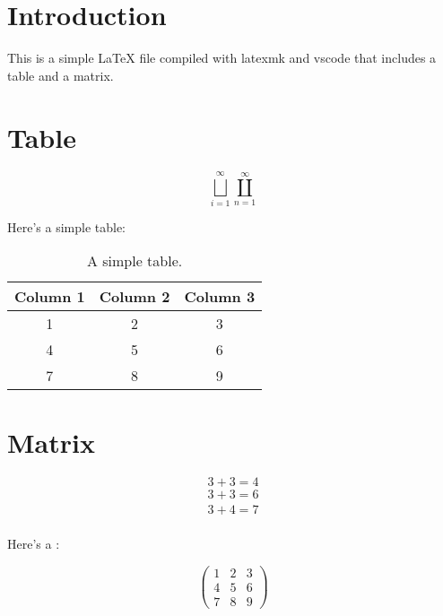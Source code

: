 \documentclass{article}
\begin{document}
\section{Introduction}

This is a simple LaTeX file compiled with latexmk and vscode that includes a table and a matrix.

\section{Table}

\[
  \bigsqcup_{i=1}^{\infty} \coprod_{n=1}^{\infty} 
\]

Here's a simple table:

\begin{table}[h]
  \centering
  \begin{tabular}{ccc}
    \toprule
    Column 1 & Column 2 & Column 3 \\
    \midrule
    1        & 2        & 3        \\
    4        & 5        & 6        \\
    7        & 8        & 9        \\
    \bottomrule
  \end{tabular}
  \caption{A simple table.}\label{tab:simple-table}
\end{table}
\section{Matrix}

\begin{equation}
  3+3 = 4
\end{equation}
\begin{align*}
  3+3 = 6 \\
  3+4 = 7 \\
\end{align*}

Here's a :

\begin{equation}
  \begin{pmatrix}
    1 & 2 & 3 \\
    4 & 5 & 6 \\
    7 & 8 & 9
  \end{pmatrix}
\end{equation}
\end{document}
